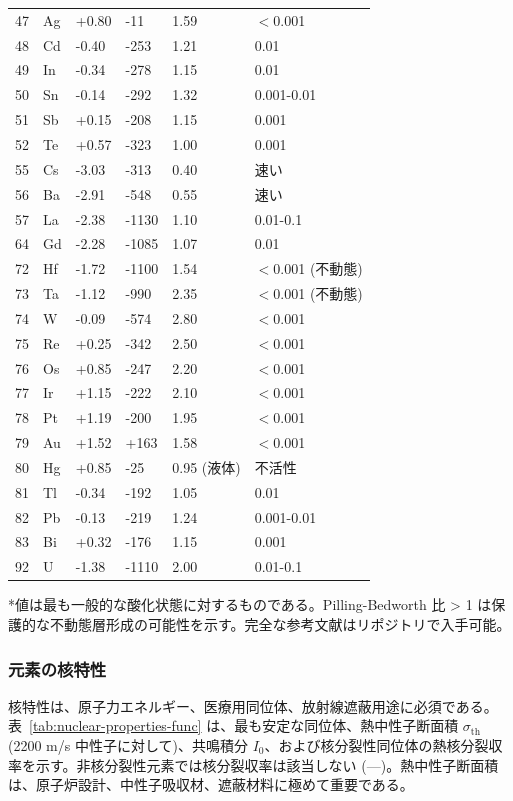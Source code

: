\documentclass[11pt,a4paper]{article}
\theoremstyle{remark}
\begin{document}
\begin{longtable}{p{0.8cm}p{1.2cm}p{2.5cm}p{2.5cm}p{2.5cm}p{2.5cm}}
		47 & Ag & +0.80 & -11 & 1.59 & $<$0.001 \\
		48 & Cd & -0.40 & -253 & 1.21 & 0.01 \\
		49 & In & -0.34 & -278 & 1.15 & 0.01 \\
		50 & Sn & -0.14 & -292 & 1.32 & 0.001-0.01 \\
		51 & Sb & +0.15 & -208 & 1.15 & 0.001 \\
		52 & Te & +0.57 & -323 & 1.00 & 0.001 \\
		55 & Cs & -3.03 & -313 & 0.40 & 速い \\
		56 & Ba & -2.91 & -548 & 0.55 & 速い \\
		57 & La & -2.38 & -1130 & 1.10 & 0.01-0.1 \\
		64 & Gd & -2.28 & -1085 & 1.07 & 0.01 \\
		72 & Hf & -1.72 & -1100 & 1.54 & $<$0.001 (不動態) \\
		73 & Ta & -1.12 & -990 & 2.35 & $<$0.001 (不動態) \\
		74 & W  & -0.09 & -574 & 2.80 & $<$0.001 \\
		75 & Re & +0.25 & -342 & 2.50 & $<$0.001 \\
		76 & Os & +0.85 & -247 & 2.20 & $<$0.001 \\
		77 & Ir & +1.15 & -222 & 2.10 & $<$0.001 \\
		78 & Pt & +1.19 & -200 & 1.95 & $<$0.001 \\
		79 & Au & +1.52 & +163 & 1.58 & $<$0.001 \\
		80 & Hg & +0.85 & -25 & 0.95 (液体) & 不活性 \\
		81 & Tl & -0.34 & -192 & 1.05 & 0.01 \\
		82 & Pb & -0.13 & -219 & 1.24 & 0.001-0.01 \\
		83 & Bi & +0.32 & -176 & 1.15 & 0.001 \\
		92 & U  & -1.38 & -1110 & 2.00 & 0.01-0.1 \\
		\bottomrule
	\end{longtable}
	*値は最も一般的な酸化状態に対するものである。Pilling-Bedworth 比 > 1 は保護的な不動態層形成の可能性を示す。完全な参考文献はリポジトリで入手可能。
	
	\subsubsection{元素の核特性}
	\label{subsec:nuclear-properties-func}
	
	核特性は、原子力エネルギー、医療用同位体、放射線遮蔽用途に必須である。表~\ref{tab:nuclear-properties-func} は、最も安定な同位体、熱中性子断面積 \(\sigma_{\text{th}}\) (2200 m/s 中性子に対して)、共鳴積分 \(I_0\)、および核分裂性同位体の熱核分裂収率を示す。非核分裂性元素では核分裂収率は該当しない (---)。熱中性子断面積は、原子炉設計、中性子吸収材、遮蔽材料に極めて重要である。
	
\end{document}

